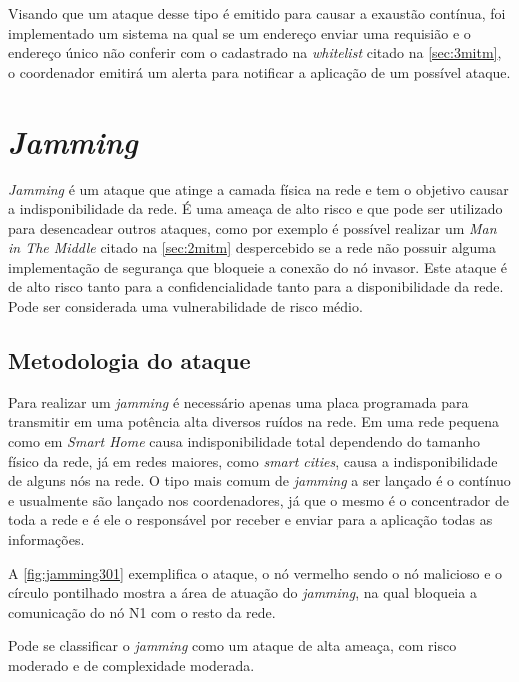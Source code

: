 \par Visando que um ataque desse tipo \'e emitido para causar a exaust\~ao cont\'inua, foi implementado um sistema na qual se um endere\c{c}o enviar uma requisi\~ao e o endere\c{c}o \'unico n\~ao conferir com o cadastrado na \emph{whitelist} citado na \autoref{sec:3mitm}, o coordenador emitir\'a um alerta para notificar a aplica\c{c}\~ao de um poss\'ivel ataque.

\section{\emph{Jamming}}
\label{sec:jammer}
\par \emph{Jamming} \'e um ataque que atinge a camada f\'isica na rede e tem o objetivo causar a indisponibilidade da rede. \'E uma amea\c{c}a de alto risco e que pode ser utilizado para desencadear outros ataques, como por exemplo \'e poss\'ivel realizar um \emph{Man in The Middle} citado na \autoref{sec:2mitm} despercebido se a rede n\~ao possuir alguma implementa\c{c}\~ao de seguran\c{c}a que bloqueie a conex\~ao do n\'o invasor. Este ataque \'e de alto risco tanto para a confidencialidade tanto para a disponibilidade da rede. Pode ser considerada uma vulnerabilidade de risco m\'edio.

\subsection{Metodologia do ataque} 
\par Para realizar um \emph{jamming} \'e necess\'ario apenas uma placa programada para transmitir em uma pot\^encia alta diversos ru\'idos na rede. Em uma rede pequena como em \emph{Smart Home} causa indisponibilidade total dependendo do tamanho f\'isico da rede, j\'a em redes maiores, como \emph{smart cities}, causa a indisponibilidade de alguns n\'os na rede. O tipo mais comum de \emph{jamming} a ser lan\c{c}ado \'e o cont\'inuo e usualmente s\~ao lan\c{c}ado nos coordenadores, j\'a que o mesmo \'e o concentrador de toda a rede e \'e ele o respons\'avel por receber e enviar para a aplica\c{c}\~ao todas as informa\c{c}\~oes.



\par A \autoref{fig:jamming301} exemplifica o ataque, o n\'o vermelho sendo o n\'o malicioso e o c\'irculo pontilhado mostra a \'area de atua\c{c}\~ao do \emph{jamming}, na qual bloqueia a comunica\c{c}\~ao do n\'o N1 com o resto da rede.

\par Pode se classificar o \emph{jamming} como um ataque de alta amea\c{c}a, com risco moderado e de complexidade moderada.

